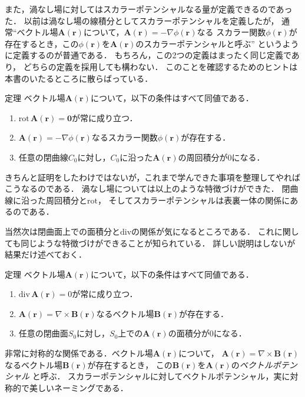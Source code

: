 また，渦なし場に対してはスカラーポテンシャルなる量が定義できるのであった．
以前は渦なし場の線積分としてスカラーポテンシャルを定義したが，
通常``ベクトル場$\bm{A}(\bm{r})$について，$\bm{A}(\bm{r}) = - \nabla \phi (\bm{r})$なる
スカラー関数$\phi(\bm{r})$が存在するとき，この$\phi (\bm{r})$を$\bm{A}(\bm{r})$のスカラーポテンシャルと呼ぶ''
というように定義するのが普通である．
もちろん，この2つの定義はまったく同じ定義であり，
どちらの定義を採用しても構わない．
このことを確認するためのヒントは本書のいたるところに散らばっている．
\begin{itembox}[l]{定理}
ベクトル場$\bm{A}(\bm{r})$について，以下の条件はすべて同値である．
\begin{enumerate}
\item $\mathrm{rot} \, \bm{A}(\bm{r})=\bm{0}$が常に成り立つ．
\item $\bm{A}(\bm{r}) = - \nabla \phi(\bm{r})$なるスカラー関数$\phi(\bm{r})$が存在する．
\item 任意の閉曲線$C_0$に対し，$C_0$に沿った$\bm{A}(\bm{r})$の周回積分が0になる．
\end{enumerate}
\end{itembox}
きちんと証明をしたわけではないが，これまで学んできた事項を整理してやればこうなるのである．
渦なし場については以上のような特徴づけができた．
閉曲線に沿った周回積分と$\mathrm{rot}$，
そしてスカラーポテンシャルは表裏一体の関係にあるのである．

当然次は閉曲面上での面積分と$\mathrm{div}$の関係が気になるところである．
これに関しても同じような特徴づけができることが知られている．
詳しい説明はしないが結果だけ述べておく．
\begin{itembox}[l]{定理}
ベクトル場$\bm{A}(\bm{r})$について，以下の条件はすべて同値である．
\begin{enumerate}
\item $\mathrm{div} \, \bm{A}(\bm{r})=0$が常に成り立つ．
\item $\bm{A}(\bm{r}) = \nabla \times \bm{B} (\bm{r})$なるベクトル場$\bm{B}(\bm{r})$が存在する．
\item 任意の閉曲面$S_0$に対し，$S_0$上での$\bm{A}(\bm{r})$の面積分が0になる．
\end{enumerate}
\end{itembox}
非常に対称的な関係である．ベクトル場$\bm{A}(\bm{r})$について，
$\bm{A}(\bm{r}) = \nabla \times \bm{B}(\bm{r})$なるベクトル場$\bm{B}(\bm{r})$が存在するとき，
この$\bm{B}(\bm{r})$を$\bm{A}(\bm{r})$の\emph{ベクトルポテンシャル}
と呼ぶ．
スカラーポテンシャルに対してベクトルポテンシャル，実に対称的で美しいネーミングである．

